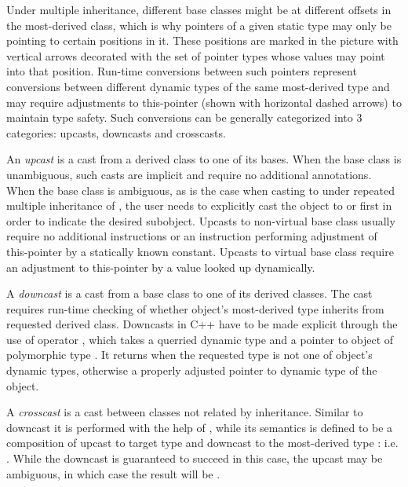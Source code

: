 Under multiple inheritance, different base classes might be at different offsets 
in the most-derived class, which is why pointers of a given static type may only 
be pointing to certain positions in it. These positions are marked in the 
picture with vertical arrows decorated with the set of pointer types whose 
values may point into that position. Run-time conversions between such pointers 
represent conversions between different dynamic types of the same most-derived 
type and may require adjustments to this-pointer (shown with horizontal dashed 
arrows) to maintain type safety. Such conversions can be generally categorized 
into 3 categories: upcasts, downcasts and crosscasts.

An \emph{upcast} is a cast from a derived class to one of its bases. When the 
base class is unambiguous, such casts are implicit and require no additional 
annotations. When the base class is ambiguous, as is the case when casting 
 to  under repeated multiple inheritance of , the user 
needs to explicitly cast the object to  or  first in order to 
indicate the desired subobject. Upcasts to non-virtual base class usually 
require no additional instructions or an instruction performing adjustment of 
this-pointer by a statically known constant. Upcasts to virtual base class 
require an adjustment to this-pointer by a value looked up dynamically.

A \emph{downcast} is a cast from a base class to one of its derived classes. The 
cast requires run-time checking of whether object's most-derived type inherits 
from requested derived class. Downcasts in C++ have to be made explicit through 
the use of operator , which takes a querried 
dynamic type  and a pointer  to object of polymorphic type 
. It returns  when the requested type is not one of 
object's dynamic types, otherwise a properly adjusted pointer to dynamic type 
 of the object.

A \emph{crosscast} is a cast between classes not related by inheritance. Similar 
to downcast it is performed with the help of , while its 
semantics is defined to be a composition of upcast to target type and downcast 
to the most-derived type : i.e. . While 
the downcast is guaranteed to succeed in this case, the upcast may be ambiguous, 
in which case the result will be .

